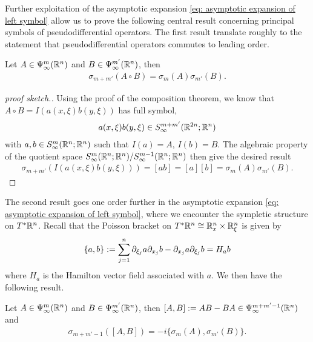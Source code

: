\documentclass[12pt]{article}
\begin{document}
Further exploitation of the asymptotic expansion \ref{eq: asymptotic expansion of left symbol} allow us to prove the following central result concerning principal symbols of pseudodifferential operators. The first result translate roughly to the statement that pseudodifferential operators commutes to leading order. 

\begin{fprop}
    Let $A \in \Psi^{m}_{\infty}({\mathbb R}^n)$ and $B \in \Psi^{m'}_{\infty}({\mathbb R}^n)$, then 
    \begin{align*}
    \sigma_{m + m'}(A \circ B) = \sigma_m(A) \sigma_{m'}(B). 
    \end{align*}
\end{fprop}
\begin{proof}[proof sketch.] Using the proof of the composition theorem, we know that $A \circ B = I(a(x, \xi)b(y, \xi))$ has full symbol, 
    \begin{align*}
    a(x, \xi) b(y, \xi) \in S^{m + m'}_\infty({\mathbb R}^{2n}; {\mathbb R}^n)
    \end{align*}
    with $a, b \in S^{m}_\infty({\mathbb R}^{n}; {\mathbb R}^n)$ such that $I(a) = A$, $I(b) = B$. The algebraic property of the quotient space $S^{m}_\infty({\mathbb R}^{n}; {\mathbb R}^n) / S^{m-1}_\infty({\mathbb R}^{n}; {\mathbb R}^n)$ then give the desired result
    \begin{align*}
    \sigma_{m + m'}(I(a(x,\xi)b(y, \xi))) = [a b] = [a] [b] =  \sigma_m(A) \sigma_{m'}(B). 
    \end{align*}
\end{proof}

The second result goes one order further in the asymptotic expansion \ref{eq: asymptotic expansion of left symbol}, where we encounter the sympletic structure on $T^*{\mathbb R}^n$. Recall that the Poisson bracket on $T^*{\mathbb R}^n \cong {\ensuremath {\mathbb R}}^n_x \times {\ensuremath {\mathbb R}}^n_\xi $ is given by 
\begin{align*}
\{a, b\} := \sum_{j = 1}^n \partial_{\xi_j}a \partial_{x_j}b - \partial_{x_j} a \partial_{\xi_j}b = H_{a}b 
\end{align*}
where $H_a$ is the Hamilton vector field associated with $a$. We then have the following result. 
\begin{fprop}
    Let $A \in \Psi^{m}_{\infty}({\mathbb R}^n)$ and $B \in \Psi^{m'}_{\infty}({\mathbb R}^n)$, then $[A, B] := AB - BA \in \Psi^{m + m' - 1}_{\infty}({\mathbb R}^n)$ and 
    \begin{align*}
    \sigma_{m + m' -1}([A, B]) = -i \{ \sigma_{m}(A), \sigma_{m'}(B) \}. 
    \end{align*}
\end{fprop}
\end{document}

